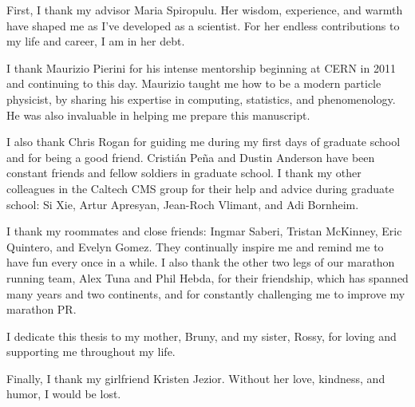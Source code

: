 \begin{acknowledgments}     %
                                                                                                         
First, I thank my advisor Maria Spiropulu. Her
wisdom, experience, and warmth have shaped me as I've
developed as a scientist. For her endless contributions to my life
and career, I am in her debt.

I thank Maurizio Pierini for his intense mentorship beginning at CERN
in 2011 and continuing to this day. Maurizio taught me how to be a
modern particle physicist, by sharing his expertise in computing, statistics, and
phenomenology. He was also invaluable in helping me prepare this manuscript.

I also thank Chris Rogan for guiding me during my first days of
graduate school and for being a good friend. Cristi\'{a}n Pe\~{n}a and
Dustin Anderson have been constant friends and fellow soldiers in
graduate school. I thank my other colleagues in the Caltech CMS group
for their help and advice during graduate school: Si Xie, Artur
Apresyan, Jean-Roch Vlimant, and Adi Bornheim.

I thank my roommates and close friends: Ingmar Saberi, Tristan McKinney,
Eric Quintero, and Evelyn Gomez. They continually inspire me and
remind me to have fun every once in a while. 
I also thank the other two legs of our marathon running team, Alex Tuna and Phil Hebda, for their friendship,
which has spanned many years and two continents, and for constantly challenging
me to improve my marathon PR.

I dedicate this thesis to my mother, Bruny, and my sister, Rossy, for
loving and supporting me throughout my life.

Finally, I thank my girlfriend Kristen Jezior. Without her love,
kindness, and humor, I would be lost.

\end{acknowledgments}